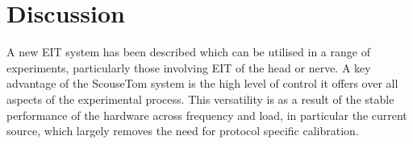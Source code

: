 \section{Discussion}
A new EIT system has been described which can be utilised in a range of experiments, particularly those involving EIT of the head or nerve. A key advantage of the ScouseTom system is the high level of control it offers over all aspects of the experimental process. This versatility is as a result of the stable performance of the hardware across frequency and load, in particular the current source, which largely removes the need for protocol specific calibration. 